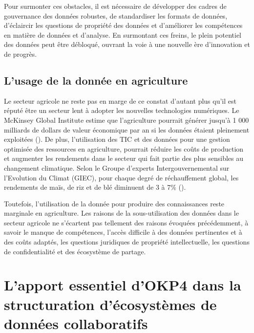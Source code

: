 
Pour surmonter ces obstacles, il est nécessaire de développer des cadres de gouvernance des données robustes, de standardiser les formats de données, d'éclaircir les questions de propriété des données et d'améliorer les compétences en matière de données et d'analyse. En surmontant ces freins, le plein potentiel des données peut être débloqué, ouvrant la voie à une nouvelle ère d'innovation et de progrès.


\subsection{L'usage de la donnée en agriculture}\label{subsec:data_in_agri}


Le secteur agricole ne reste pas en marge de ce constat d'autant plus qu'il est réputé être un secteur lent à adopter les nouvelles technologies numériques. Le McKinsey Global Institute estime que l'agriculture pourrait générer jusqu'à 1 000 milliards de dollars de valeur économique par an si les données étaient pleinement exploitées (\cite{james_manyika_digital_2016}). De plus, l'utilisation des TIC et des données pour une gestion optimisée des ressources en agriculture, pourrait réduire les coûts de production et augmenter les rendements dans le secteur qui fait partie des plus sensibles au changement climatique. Selon le Groupe d'experts Intergouvernemental sur l'Evolution du Climat (GIEC), pour chaque degré de réchauffement global, les rendements de maïs, de riz et de blé diminuent de 3 à 7\% (\cite{ipcc_global_2022}).

Toutefois, l'utilisation de la donnée pour produire des connaissances reste marginale en agriculture. Les raisons de  la sous-utilisation des données dans le secteur agricole ne s'écartent pas tellement des raisons évoquées précédemment, à savoir le manque de compétences, l'accès difficile à des données pertinentes et à des coûts adaptés, les questions juridiques de propriété intellectuelle, les questions de confidentialité et des écosystème de partage.


\section{L'apport essentiel d'OKP4 dans la structuration d'écosystèmes de données collaboratifs}
\label{sec:okp4_sas}


